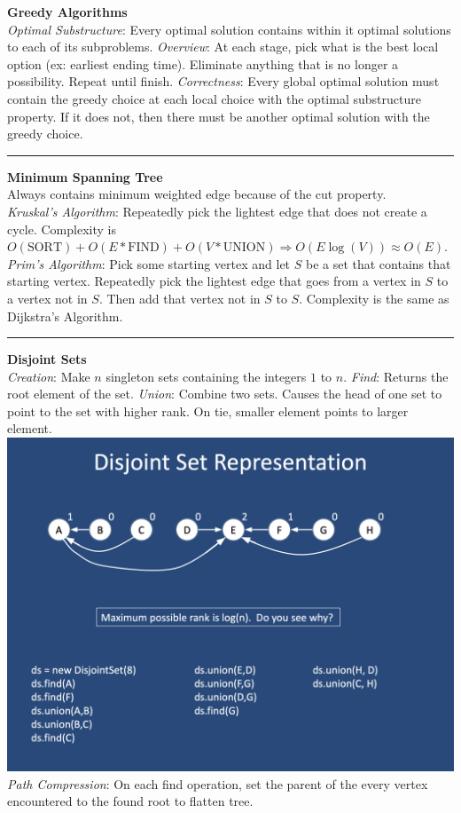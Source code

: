 \documentclass[9pt]{amsart}
\begin{document}
\begin{multicols*}{3}
  \textbf{Greedy Algorithms} \\
  \textit{Optimal Substructure}: Every optimal solution contains within it optimal solutions to each of its subproblems.
  \vskip 2pt
  \textit{Overview}: At each stage, pick what is the best local option (ex: earliest ending time). Eliminate anything that is no longer a possibility. Repeat until finish.
  \vskip 2pt
  \textit{Correctness}: Every global optimal solution must contain the greedy choice at each local choice with the optimal substructure property. If it does not, then there must be another optimal solution with the greedy choice.

  \vskip 7pt
  \hrule
  \vskip 7pt

  \textbf{Minimum Spanning Tree} \\
  Always contains minimum weighted edge because of the cut property. \\
  \textit{Kruskal's Algorithm}: Repeatedly pick the lightest edge that does not create a cycle. Complexity is $O(\text{SORT}) + O(E * \text{FIND}) + O(V * \text{UNION}) \Rightarrow O(E \log(V)) \approx O(E)$.
  \vskip 2pt
  \textit{Prim's Algorithm}: Pick some starting vertex and let $S$ be a set that contains that starting vertex. Repeatedly pick the lightest edge that goes from a vertex in $S$ to a vertex not in $S$. Then add that vertex not in $S$ to $S$. Complexity is the same as Dijkstra's Algorithm.

  \vskip 7pt
  \hrule
  \vskip 7pt

  \textbf{Disjoint Sets} \\
  \textit{Creation}: Make $n$ singleton sets containing the integers $1$ to $n$.
  \vskip 2pt
  \textit{Find}: Returns the root element of the set.
  \vskip 2pt
  \textit{Union}: Combine two sets. Causes the head of one set to point to the set with higher rank. On tie, smaller element points to larger element.
  \vskip 2pt
  \includegraphics[width=\columnwidth]{disjoint_sets.png}
  \vskip 2pt
  \textit{Path Compression}: On each find operation, set the parent of the every vertex encountered to the found root to flatten tree.


\end{multicols*}
\end{document}
